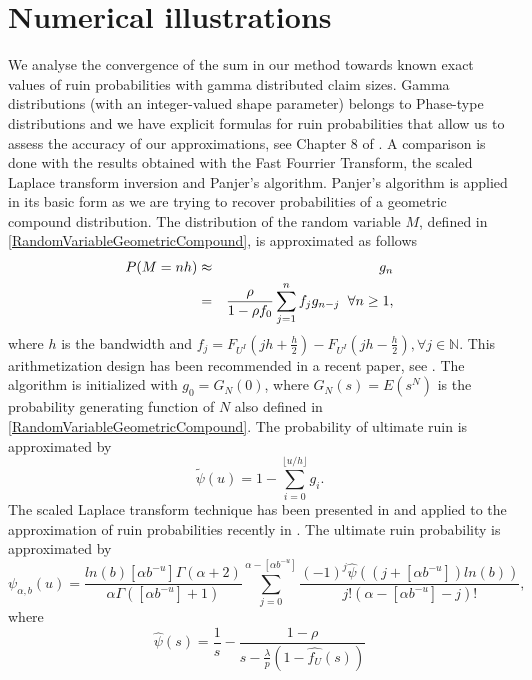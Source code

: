 \section{Numerical illustrations}
We analyse the convergence of the sum in our method towards known exact values of ruin probabilities with gamma distributed claim sizes. Gamma distributions (with an integer-valued shape parameter) belongs to Phase-type distributions and  we have explicit formulas for ruin probabilities that allow us to assess the accuracy of our approximations, see Chapter 8 of \citet{AsAl10}. A comparison is done with the results obtained with the Fast Fourrier Transform, the scaled Laplace transform inversion and Panjer's algorithm. Panjer\rq{}s algorithm is applied in its basic form as we are trying to recover probabilities of a geometric compound distribution. The distribution of the random variable $M$, defined in \eqref{RandomVariableGeometricCompound}, is approximated as follows 
\begin{eqnarray}\label{PangerRecursion}
P(M=nh)&\approx& g_{n}\nonumber\\
&=&\frac{\rho}{1-\rho f_{0}}\sum_{j=1}^{n}f_{j}g_{n-j}\hspace{0.2cm}\forall n\geq1,\label{PangerRecursion}
\end{eqnarray}
where $h$ is the bandwidth and $f_{j}=F_{U^{I}}\left(jh+\frac{h}{2}\right)-F_{U^{I}}\left(jh-\frac{h}{2}\right),\forall j\in\mathbb{N}$. This arithmetization design has been recommended in a recent paper, see \citet{EmFr09}. The algorithm is initialized with $g_{0}=G_{N}(0)$, where $G_{N}(s)=E(s^{N})$ is the probability generating function of $N$ also defined in \eqref{RandomVariableGeometricCompound}. The probability of ultimate ruin is approximated by
\begin{equation*}
\tilde{\psi}(u)=1-\sum^{\lfloor{u/h}\rfloor}_{i=0}g_{i}.\nonumber
\end{equation*} 
The scaled Laplace transform technique has been presented in \citet{MnSa13} and applied to the approximation of ruin probabilities recently in \citet{MnSaHa14}. The ultimate ruin probability is approximated by
\begin{equation}\label{ScaledLaplaceTransformInversionFormula}
\psi_{\alpha,b}(u)=\frac{ln(b)[\alpha b^{-u}]\Gamma(\alpha+2)}{\alpha\Gamma([\alpha b^{-u}]+1)}\sum^{\alpha-[\alpha b^{-u}]}_{j=0}\frac{(-1)^{j}\widehat{\psi}((j+[\alpha b^{-u}])ln(b))}{j!(\alpha-[\alpha b^{-u}]-j)!},
\end{equation}
where 
\begin{equation}
\widehat{\psi}(s)=\frac{1}{s}-\frac{1-\rho}{s-\frac{\lambda}{p}\left(1-\widehat{f_{U}}(s)\right)}
\end{equation} 
